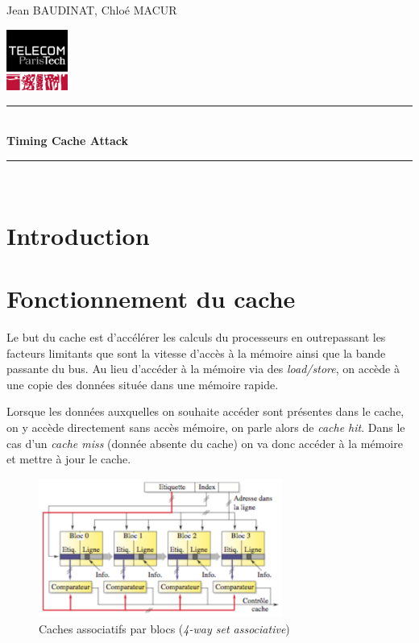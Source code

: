 \documentclass[a4paper,11pt]{article}
\newcommand{\HRule}{\rule{\linewidth}{0.5mm}}
\newcommand{\reporttitle}{Timing Cache Attack}
\newcommand{\reportauthor}{Jean BAUDINAT, Chloé MACUR}
\begin{document}
	

\begin{center}

\begin{minipage}[t]{0.4\textwidth}
  \begin{flushleft} \large
    \reportauthor
  \vfill
  \end{flushleft}
\end{minipage}
\begin{minipage}[t]{0.5\textwidth}
  \begin{flushright}
  \includegraphics [width=20mm]{figures/tpt.jpg}
  \end{flushright}
\end{minipage}
\HRule \\[0.4cm]
{\huge \bfseries \reporttitle}\\[0.1cm]
\HRule \\
\end{center}

\section*{Introduction} %

\section{Fonctionnement du cache}

Le but du cache est d'accélérer les calculs du processeurs en outrepassant les facteurs limitants que sont la vitesse d'accès à la mémoire ainsi que la bande passante du bus. Au lieu d'accéder à la mémoire via des \emph{load/store}, on accède à une copie des données située dans une mémoire rapide.

Lorsque les données auxquelles on souhaite accéder sont présentes dans le cache, on y accède directement sans accès mémoire, on parle alors de \emph{cache hit}. Dans le cas d'un \emph{cache miss} (donnée absente du cache) on va donc accéder à la mémoire et mettre à jour le cache.
  
\begin{figure}[h]
  \centering
  \includegraphics[width=8cm]{figures/cache_associative.png}
  \caption{Caches associatifs par blocs (\emph{4-way set associative})}
  \label{cache} 
\end{figure}
\end{document}
